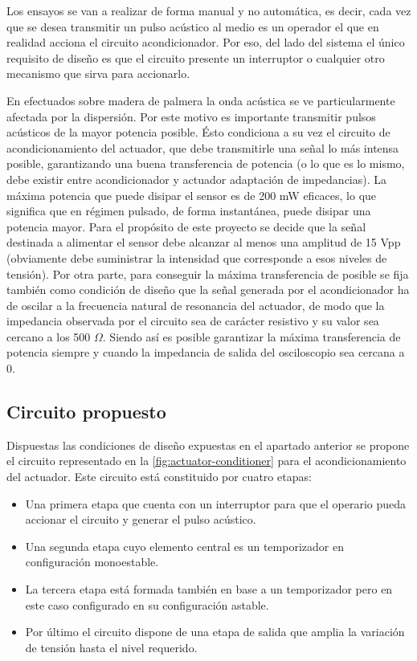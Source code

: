 Los ensayos se van a realizar de forma manual y no automática, es decir,
cada vez que se desea transmitir un pulso acústico al medio es un operador
el que en realidad acciona el circuito acondicionador. Por eso, del lado
del sistema el único requisito de diseño es que el circuito presente un
interruptor o cualquier otro mecanismo que sirva para accionarlo.

En  efectuados sobre madera de palmera la onda acústica se ve
particularmente afectada por la dispersión. Por este motivo es importante
transmitir pulsos acústicos de la mayor potencia posible. Ésto condiciona a
su vez el circuito de acondicionamiento del actuador, que debe transmitirle
una señal lo más intensa posible, garantizando una buena transferencia de
potencia (o lo que es lo mismo, debe existir entre acondicionador y
actuador adaptación de impedancias). La máxima potencia que puede disipar
el sensor es de 200 mW eficaces, lo que significa que en régimen pulsado,
de forma instantánea, puede disipar una potencia mayor. Para el propósito
de este proyecto se decide que la señal destinada a alimentar el sensor
debe alcanzar al menos una amplitud de 15 Vpp (obviamente debe suministrar
la intensidad que corresponde a esos niveles de tensión). Por otra parte,
para conseguir la máxima transferencia de posible se fija también como
condición de diseño que la señal generada por el acondicionador ha de
oscilar a la frecuencia natural de resonancia del actuador, de modo que la
impedancia observada por el circuito sea de carácter resistivo y su valor
sea cercano a los 500 $\Omega$. Siendo así es posible garantizar la máxima
transferencia de potencia siempre y cuando la impedancia de salida del
osciloscopio sea cercana a 0.


\subsection{Circuito propuesto}

Dispuestas las condiciones de diseño expuestas en el apartado anterior se
propone el circuito representado en la \cref{fig:actuator-conditioner} para
el acondicionamiento del actuador. Este circuito está constituido por
cuatro etapas:

\begin{itemize}
    \item Una primera etapa que cuenta con un interruptor para que el
	operario pueda accionar el circuito y generar el pulso acústico.
    \item Una segunda etapa cuyo elemento central es un temporizador en
	configuración monoestable.
    \item La tercera etapa está formada también en base a un temporizador
	pero en este caso configurado en su configuración astable.
    \item Por último el circuito dispone de una etapa de salida que amplia
	la variación de tensión hasta el nivel requerido.
\end{itemize}

